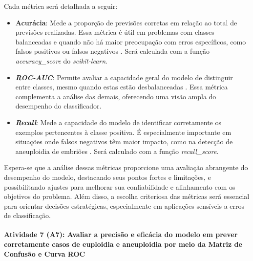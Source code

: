 Cada métrica será detalhada a seguir:

\begin{itemize}
    \item \textbf{Acurácia}: Mede a proporção de previsões corretas em relação ao total de previsões realizadas. Essa métrica é útil em problemas com classes balanceadas e quando não há maior preocupação com erros específicos, como falsos positivos ou falsos negativos \cite{vilela2022}. Será calculada com a função \textit{accuracy\_score} do \textit{scikit-learn}.

    \item \textbf{\textit{ROC-AUC}}: Permite avaliar a capacidade geral do modelo de distinguir entre classes, mesmo quando estas estão desbalanceadas \cite{vilela2022}. Essa métrica complementa a análise das demais, oferecendo uma visão ampla do desempenho do classificador.

    \item \textbf{\textit{Recall}}: Mede a capacidade do modelo de identificar corretamente os exemplos pertencentes à classe positiva. É especialmente importante em situações onde falsos negativos têm maior impacto, como na detecção de aneuploidia de embriões \cite{vilela2022}. Será calculado com a função \textit{recall\_score}.
\end{itemize}

Espera-se que a análise dessas métricas proporcione uma avaliação abrangente do desempenho do modelo, destacando seus pontos fortes e limitações, e possibilitando ajustes para melhorar sua confiabilidade e alinhamento com os objetivos do problema. Além disso, a escolha criteriosa das métricas será essencial para orientar decisões estratégicas, especialmente em aplicações sensíveis a erros de classificação.

\paragraph{\textbf{Atividade 7 (A7):} Avaliar a precisão e eficácia do modelo em prever corretamente casos de euploidia e aneuploidia  por meio da Matriz de Confusão e Curva ROC}

